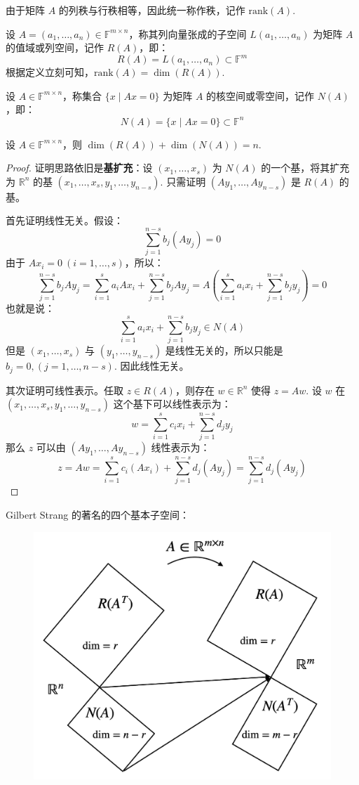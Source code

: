 \begin{definition}[秩]
由于矩阵 $A$ 的列秩与行秩相等，因此统一称作秩，记作 $\text{rank}(A)$.
\end{definition}

\begin{definition}[值域/列空间]
设 $A=(a_1,\ldots,a_n)\in\mathbb F^{m\times n}$，称其列向量张成的子空间 $L(a_1,\ldots,a_n)$ 为矩阵 $A$ 的值域或列空间，记作 $R(A)$，即：
\[
    R(A)=L(a_1,\ldots,a_n)\subset\mathbb F^m
\]
根据定义立刻可知，$\text{rank}(A)=\dim(R(A))$.
\end{definition}

\begin{definition}
设 $A\in\mathbb F^{m\times n}$，称集合 $\{x\mid Ax=0\}$ 为矩阵 $A$ 的核空间或零空间，记作 $N(A)$，即：
\[
    N(A)=\{x\mid Ax=0\}\subset\mathbb F^n
\]
\end{definition}

\begin{theorem}
设 $A\in\mathbb F^{m\times n}$，则 $\dim(R(A))+\dim(N(A))=n$.
\end{theorem}
\begin{proof}
证明思路依旧是\textbf{基扩充}：设 $(x_1,\ldots,x_s)$ 为 $N(A)$ 的一个基，将其扩充为 $\mathbb R^n$ 的基 $(x_1,\ldots,x_s,y_1,\ldots,y_{n-s})$.  只需证明 $(Ay_1,\ldots, Ay_{n-s})$ 是 $R(A)$ 的基。

首先证明线性无关。假设：
\[
    \sum_{j=1}^{n-s}b_j(Ay_j)=0
\]
由于 $Ax_i=0\ (i=1,\ldots,s)$，所以：
\[
    \sum_{j=1}^{n-s}b_jAy_j=\sum_{i=1}^sa_i Ax_i+\sum_{j=1}^{n-s}b_jAy_j=A\left(\sum_{i=1}^sa_i x_i+\sum_{j=1}^{n-s}b_jy_j\right)=0
\]
也就是说：
\[
    \sum_{i=1}^sa_i x_i+\sum_{j=1}^{n-s}b_jy_j\in N(A)
\]
但是 $(x_1,\ldots,x_s)$ 与 $(y_1,\ldots,y_{n-s})$ 是线性无关的，所以只能是 $b_j=0, (j=1,\ldots,n-s)$. 因此线性无关。

其次证明可线性表示。任取 $z\in R(A)$，则存在 $w\in\mathbb R^n$ 使得 $z=Aw$.  设 $w$ 在 $(x_1,\ldots,x_s,y_1,\ldots,y_{n-s})$ 这个基下可以线性表示为：
\[
    w=\sum_{i=1}^s c_ix_i+\sum_{j=1}^{n-s}d_j y_j
\]
那么 $z$ 可以由 $(Ay_1,\ldots,Ay_{n-s})$ 线性表示为：
\[
    z=Aw=\sum_{i=1}^s c_i (Ax_i)+\sum_{j=1}^{n-s}d_j(Ay_j)=\sum_{j=1}^{n-s}d_j(Ay_j)
\]

\end{proof}

\begin{remark}
Gilbert Strang 的著名的四个基本子空间：
\begin{figure}[H]
    \centering
    \includegraphics[width=0.55\linewidth]{figs/space.png}
\end{figure}
\end{remark}


